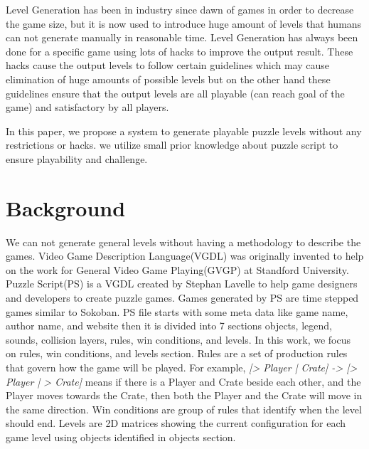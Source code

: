 \documentclass[letterpaper]{article}
\begin{document}
Level Generation has been in industry since dawn of games in order to decrease the game size, but it is now used to introduce huge amount of levels that humans can not generate manually in reasonable time. Level Generation has always been done for a specific game using lots of hacks to improve the output result. These hacks cause the output levels to follow certain guidelines which may cause elimination of huge amounts of possible levels but on the other hand these guidelines ensure that the output levels are all playable (can reach goal of the game) and satisfactory by all players\cite{mcGenerateEverything}.\\\par

In this paper, we propose a system to generate playable puzzle levels without any restrictions or hacks. we utilize small prior knowledge about puzzle script to ensure playability and challenge.

\section{Background}
We can not generate general levels without having a methodology to describe the games. Video Game Description Language(VGDL) was originally invented to help on the work for General Video Game Playing(GVGP)\cite{gvgp} at Standford University. Puzzle Script(PS) is a VGDL created by Stephan Lavelle to help game designers and developers to create puzzle games\cite{puzzleScript}. Games generated by PS are time stepped games similar to Sokoban\cite{sokoban}. PS file starts with some meta data like game name, author name, and website then it is divided into 7 sections objects, legend, sounds, collision layers, rules, win conditions, and levels. In this work, we focus on rules, win conditions, and levels section. Rules are a set of production rules that govern how the game will be played. For example, \emph{[> Player | Crate] -> [> Player | > Crate]} means if there is a Player and Crate beside each other, and the Player moves towards the Crate, then both the Player and the Crate will move in the same direction. Win conditions are group of rules that identify when the level should end. Levels are 2D matrices showing the current configuration for each game level using objects identified in objects section.
\end{document}
